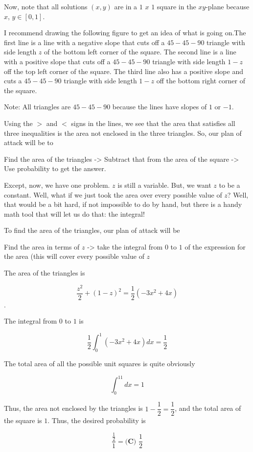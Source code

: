\begin{enumerate}
 Now, note that all solutions $(x,y)$ are in a $1$ $x$ $1$ square in the $xy$-plane because $x$, $y \in [0, 1]$.

 I recommend drawing the following figure to get an idea of what is going on.The first line is a line with a negative slope that cuts off a $45-45-90$ triangle with side length $z$ of the bottom left corner of the square. The second line is a line with a positive slope that cuts off a $45-45-90$ triangle with side length $1-z$ off the top left corner of the square. The third line also has a positive slope and cuts a $45-45-90$ triangle with side length $1 - z$ off the bottom right corner of the square. 

 Note: All triangles are $45-45-90$ because the lines have slopes of $1$ or $-1$.

 Using the $>$ and $<$ signs in the lines, we see that the area that satisfies all three inequalities is the area not enclosed in the three triangles. So, our plan of attack will be to

 Find the area of the triangles -> Subtract that from the area of the square -> Use probability to get the answer.

 Except, now, we have one problem. $z$ is still a variable. But, we want $z$ to be a constant. Well, what if we just took the area over every possible value of $z$? Well, that would be a bit hard, if not impossible to do by hand, but there is a handy math tool that will let us do that: the integral! 

 To find the area of the triangles, our plan of attack will be

 Find the area in terms of $z$ -> take the integral from $0$ to $1$ of the expression for the area (this will cover every possible value of $z$

 The area of the triangles is 

 
 \[\frac{z^2}{2} + (1-z)^2 = \frac{1}{2}\left(-3x^2 + 4x\right)\].

 The integral from $0$ to $1$ is

 
 \[\frac{1}{2}\int_0^1\left(-3x^2 + 4x\right)dx = \frac{1}{2}\]

 The total area of all the possible unit squares is quite obviously

 
 \[\int_0^11dx = 1\]

 Thus, the area not enclosed by the triangles is $1 - \dfrac{1}{2} = \dfrac{1}{2}$, and the total area of the square is $1$. Thus, the desired probability is 

 
 \[\frac{\frac{1}{2}}{1} = \boxed{\textbf{(C) }\frac12}\]





\end{enumerate}
